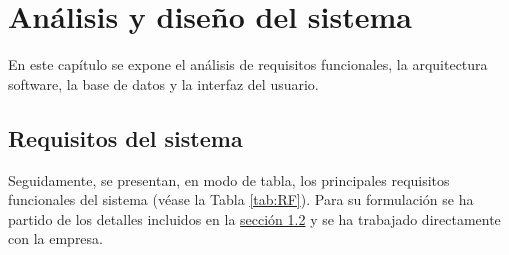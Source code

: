 \chapter{Análisis y diseño del sistema}

En este capítulo se expone el análisis de requisitos funcionales, la arquitectura software, la base de datos y la interfaz del usuario.

\section{Requisitos del sistema}
\label{section-requisitos}

Seguidamente, se presentan, en modo de tabla, los principales requisitos funcionales del sistema (véase la Tabla \ref{tab:RF}). Para su formulación se ha partido de los detalles incluidos en la \hyperref[section-objetivos]{sección 1.2} y se ha trabajado directamente con la empresa.


